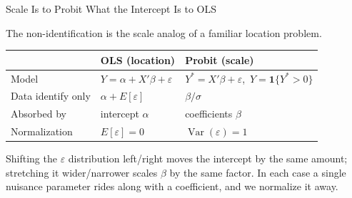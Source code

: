 \documentclass[aspectratio=169, handout, t]{beamer}
\numberwithin{equation}{section}
\begin{document}

\begin{frame}{Scale Is to Probit What the Intercept Is to OLS}

The non-identification is the scale analog of a familiar location problem.

\pause
\bigskip

\begin{center}
\renewcommand{\arraystretch}{1.3}
\begin{tabular}{l|ll}
 & \textbf{OLS (location)} & \textbf{Probit (scale)} \\ \hline
Model & $Y = \alpha + X'\beta + \varepsilon$ & $Y^{*} = X'\beta + \varepsilon$,\ $Y=\mathbf{1}\{Y^{*}>0\}$ \\
Data identify only & $\alpha + E[\varepsilon]$ & $\beta/\sigma$ \\
Absorbed by & intercept $\alpha$ & coefficients $\beta$ \\
Normalization & $E[\varepsilon]=0$ & $\operatorname{Var}(\varepsilon)=1$ \\
\end{tabular}
\end{center}

\pause
\bigskip

Shifting the $\varepsilon$ distribution left/right moves the intercept by the same amount; stretching it wider/narrower scales $\beta$ by the same factor. In each case a single nuisance parameter rides along with a coefficient, and we normalize it away.

\end{frame}

\end{document}
